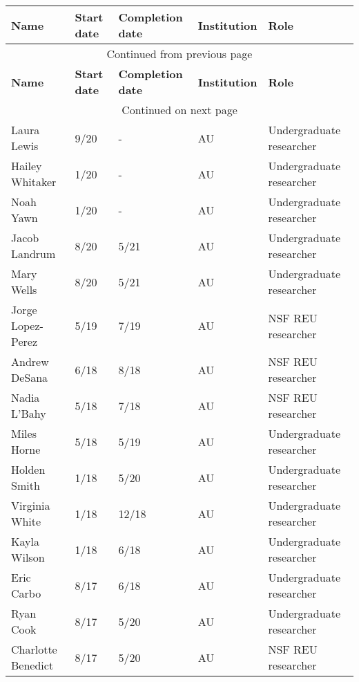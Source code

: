 {\sffamily\small
{}
\begin{longtable}[l]{ p{1.2in} p{0.5in} p{0.8in}p{0.75in} p{2in} }
    \hline
    \textbf{Name} & \textbf{Start date} & \textbf{Completion date} & \textbf{Institution} & \textbf{Role} \\
    \hline
    \endfirsthead
    \multicolumn{5}{c}{{Continued from previous page}} \\
    \hline
    \textbf{Name} & \textbf{Start date} & \textbf{Completion date} & \textbf{Institution} & \textbf{Role} \\
    \hline
    \endhead
    \hline \multicolumn{5}{c}{{Continued on next page}} \\
    \endfoot
    \hline
    \endlastfoot
    Laura Lewis & 9/20 & - & AU & Undergraduate researcher \\
    Hailey Whitaker & 1/20 & - & AU & Undergraduate researcher \\
    Noah Yawn & 1/20 & - & AU & Undergraduate researcher \\
    Jacob Landrum & 8/20 & 5/21 & AU & Undergraduate researcher \\
    Mary Wells & 8/20 & 5/21 & AU & Undergraduate researcher \\
    Jorge Lopez-Perez & 5/19 & 7/19 & AU & NSF REU researcher \\
    Andrew DeSana & 6/18 & 8/18 & AU & NSF REU researcher \\
    Nadia L'Bahy & 5/18 & 7/18 & AU & NSF REU researcher \\
    Miles Horne & 5/18 & 5/19 & AU & Undergraduate researcher \\
    Holden Smith & 1/18 & 5/20 & AU & Undergraduate researcher \\
    Virginia White & 1/18 & 12/18 & AU & Undergraduate researcher \\
    Kayla Wilson & 1/18 & 6/18 & AU & Undergraduate researcher \\
    Eric Carbo & 8/17 & 6/18 & AU & Undergraduate researcher \\
    Ryan Cook & 8/17 & 5/20 & AU & Undergraduate researcher \\
    Charlotte Benedict & 8/17 & 5/20 & AU & NSF REU researcher \\
\end{longtable}
}
